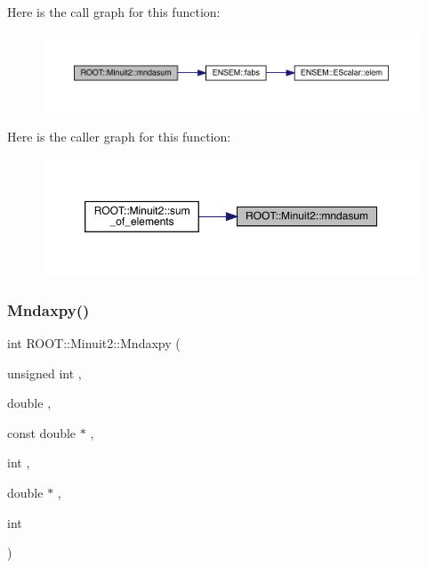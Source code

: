 Here is the call graph for this function\+:
\nopagebreak
\begin{figure}[H]
\begin{center}
\leavevmode
\includegraphics[width=350pt]{d6/d3a/namespaceROOT_1_1Minuit2_a6945787dc86a55296d0de1bf1fefc508_cgraph}
\end{center}
\end{figure}
Here is the caller graph for this function\+:
\nopagebreak
\begin{figure}[H]
\begin{center}
\leavevmode
\includegraphics[width=350pt]{d6/d3a/namespaceROOT_1_1Minuit2_a6945787dc86a55296d0de1bf1fefc508_icgraph}
\end{center}
\end{figure}
\mbox{\label{namespaceROOT_1_1Minuit2_a4784db8e0b280e76eb6f8b00e2b395dd}} 
\subsubsection{\texorpdfstring{Mndaxpy()}{Mndaxpy()}}
{\footnotesize\ttfamily int R\+O\+O\+T\+::\+Minuit2\+::\+Mndaxpy (\begin{DoxyParamCaption}\item[{unsigned int}]{,  }\item[{double}]{,  }\item[{const double $\ast$}]{,  }\item[{int}]{,  }\item[{double $\ast$}]{,  }\item[{int}]{ }\end{DoxyParamCaption})}

